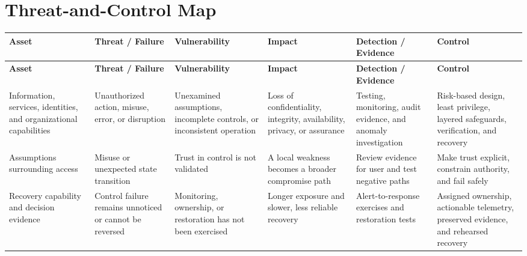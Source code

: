 \documentclass[11pt]{article}
\begin{document}
\section*{Threat-and-Control Map}
\begingroup\scriptsize\setlength{\tabcolsep}{2pt}
\begin{longtable}{>{\RaggedRight\arraybackslash}p{}>{\RaggedRight\arraybackslash}p{}>{\RaggedRight\arraybackslash}p{}>{\RaggedRight\arraybackslash}p{}>{\RaggedRight\arraybackslash}p{}>{\RaggedRight\arraybackslash}p{}}
\toprule\rowcolor{Navy}\color{white}\textbf{Asset} & \color{white}\textbf{Threat / Failure} & \color{white}\textbf{Vulnerability} & \color{white}\textbf{Impact} & \color{white}\textbf{Detection / Evidence} & \color{white}\textbf{Control}\\\midrule
\endfirsthead
\toprule\rowcolor{Navy}\color{white}\textbf{Asset} & \color{white}\textbf{Threat / Failure} & \color{white}\textbf{Vulnerability} & \color{white}\textbf{Impact} & \color{white}\textbf{Detection / Evidence} & \color{white}\textbf{Control}\\\midrule
\endhead
Information, services, identities, and organizational capabilities & Unauthorized action, misuse, error, or disruption & Unexamined assumptions, incomplete controls, or inconsistent operation & Loss of confidentiality, integrity, availability, privacy, or assurance & Testing, monitoring, audit evidence, and anomaly investigation & Risk-based design, least privilege, layered safeguards, verification, and recovery\\\midrule
Assumptions surrounding access & Misuse or unexpected state transition & Trust in control is not validated & A local weakness becomes a broader compromise path & Review evidence for user and test negative paths & Make trust explicit, constrain authority, and fail safely\\\midrule
Recovery capability and decision evidence & Control failure remains unnoticed or cannot be reversed & Monitoring, ownership, or restoration has not been exercised & Longer exposure and slower, less reliable recovery & Alert-to-response exercises and restoration tests & Assigned ownership, actionable telemetry, preserved evidence, and rehearsed recovery\\\midrule
\bottomrule
\end{longtable}
\endgroup
\end{document}
